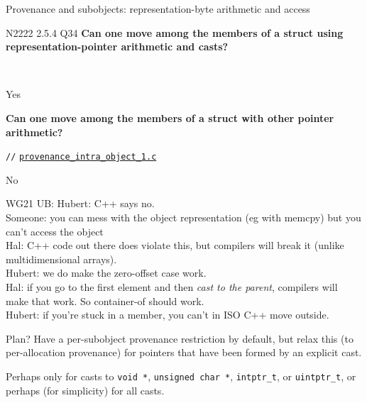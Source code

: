 \documentclass[ignorenonframetext,aspectratio=169]{beamer}
\newcommand{\ub}[1]{{\color{purple}WG21 UB: #1}}
\newcommand{\mytesturl}[1]{https://cerberus.cl.cam.ac.uk/cerberus?defacto/#1}
\newcommand{\mytestlink}[2]{\href{\mytesturl{#1}}{#2}}
\newcommand{\mylsttestlink}[1]{\mytestlink{#1}{\lstinline{#1}}}
\newcommand{\mylistingmargin}{5mm}
\newcommand{\myfooexample}[3]{{\vspace*{0.5\baselineskip}\par{\noindent\small\hspace*{\mylistingmargin}\lstinline{//} \mylsttestlink{#2}\vspace*{0.25\baselineskip}\par}}}
\begin{document}
\begin{frame}{Provenance and subobjects: representation-byte arithmetic and access}

N2222 2.5.4 Q34 \textbf{Can one move among the
members of a struct using representation-pointer arithmetic and
casts?} %

\

Yes

\textbf{Can one move among the members of a struct with other pointer arithmetic?}  


\myfooexample{../../../rsem/csem/charon2/tests/de_facto_memory_model/}{provenance_intra_object_1.c}{http://www.cl.cam.ac.uk/users/pes20/cerberus/tests/provenance_intra_object_1.c.html}

No

\ub{Hubert: C++ says no.\\
  Someone: you can mess with the object representation (eg with memcpy) but you can't access the object\\
  Hal: C++ code out there does violate this, but compilers will break it (unlike multidimensional arrays).\\
  Hubert: we do make the zero-offset case work.\\
  Hal: if you go to the first element and then \emph{cast to the parent}, compilers will make that work. So container-of should work.\\
  Hubert: if you're stuck in a member, you can't in ISO C++ move outside.
  }

  \end{frame}


\begin{frame}{Plan?}
Have a per-subobject
provenance restriction by default, but relax this (to per-allocation
provenance) for pointers that have been formed by an explicit cast.

Perhaps only for casts to \lstinline{void *}, \lstinline{unsigned char *}, \lstinline{intptr_t}, or
\lstinline{uintptr_t}, or perhaps (for simplicity) for all casts.
\end{frame}
\end{document}
